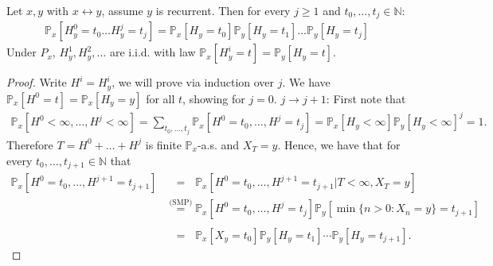 \begin{lemma}[]
	Let $x,y$ with $x \leftrightarrow y$, assume $y$ is recurrent. Then for every $j \geq 1$ and $t_0, \ldots, t_j \in \mathbb{N}$:
\begin{align}
	\mathbb{P}_{x} \left[ H_y^0=t_0 \ldots H_y^j=t_j \right] = \mathbb{P}_{x} \left[ H_y=t_0 \right] \mathbb{P}_{y} \left[ H_y=t_1 \right]  \ldots  \mathbb{P}_{y} \left[ H_y=t_j \right] 
\end{align}
Under $P_x$, $H_y^1,H_y^2, \ldots $ are i.i.d. with law $\mathbb{P}_{x} \left[ H_y^i=t \right] = \mathbb{P}_{y} \left[ H_y=t \right] $.
\end{lemma}
\begin{proof}
	Write $H^i = H_y^i$, we will prove via induction over $j$. We have $\mathbb{P}_{x} \left[ H^0 = t \right]  = \mathbb{P}_{x} \left[ H_y = y \right] $ for all $t$, showing for $j=0$.
	$j \to j+1$: First note that 
	\begin{align}
	\mathbb{P}_{x} \left[ H^0 < \infty, \ldots, H^j < \infty \right] = \sum_{t_0,\ldots, t_j}^{} \mathbb{P}_{x} \left[ H^0 = t_0, \ldots, H^j=t_j \right] = \mathbb{P}_{x} \left[ H_y < \infty \right] \mathbb{P}_{y} \left[ H_y < \infty \right] ^j = 1.
	\end{align}
	Therefore $T = H^0 + \ldots + H^j$ is finite $\mathbb{P}_{x} $-a.s. and $X_T=y$. Hence, we have that for every $t_0,\ldots,t_{j+1} \in \mathbb{N}$ that
	\begin{align}
		\mathbb{P}_{x} \left[ H^0=t_0,\ldots,H^{j+1}=t_{j+1} \right] &\stackrel{\phantom{\textrm{(SMP)}}}{=} \mathbb{P}_{x} \left[ H^0 = t_0, \ldots, H^{j+1}=t_{j+1} | T<\infty, X_T = y \right]  \\
		&\stackrel{\textrm{(SMP)}}{=} \mathbb{P}_{x} \left[ H^0=t_0, \ldots, H^j=t_j \right] \mathbb{P}_{y} \left[ \min\{n> 0: X_n =y\} = t_{j+1} \right] \\ 
	&\stackrel{\phantom{\textrm{(SMP)}}}{=} \mathbb{P}_{x} \left[ X_y = t_0 \right] \mathbb{P}_{y} \left[ H_y = t_1 \right] \cdots \mathbb{P}_{y} \left[ H_y = t_{j+1} \right]  
	.\end{align}
\end{proof}

